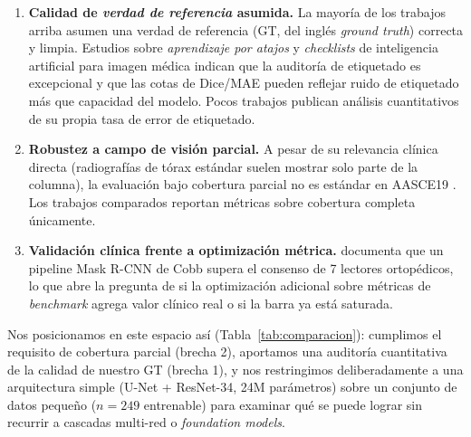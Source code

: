 \documentclass[conference]{IEEEtran}
\begin{document}
\begin{enumerate}
\item \textbf{Calidad de \emph{verdad de referencia} asumida.} La mayoría de los trabajos arriba asumen una verdad de referencia (GT, del inglés \emph{ground truth}) correcta y limpia. Estudios sobre \emph{aprendizaje por atajos} \cite{shortcut} y \emph{checklists} de inteligencia artificial para imagen médica \cite{claim} indican que la auditoría de etiquetado es excepcional y que las cotas de Dice/MAE pueden reflejar ruido de etiquetado más que capacidad del modelo. Pocos trabajos publican análisis cuantitativos de su propia tasa de error de etiquetado.
\item \textbf{Robustez a campo de visión parcial.} A pesar de su relevancia clínica directa (radiografías de tórax estándar suelen mostrar solo parte de la columna), la evaluación bajo cobertura parcial no es estándar en AASCE19 \cite{aasce19}. Los trabajos comparados \cite{seg4reg, lanet, scolionet} reportan métricas sobre cobertura completa únicamente.
\item \textbf{Validación clínica frente a optimización métrica.} \cite{mazurowski} documenta que un pipeline Mask R-CNN de Cobb supera el consenso de 7 lectores ortopédicos, lo que abre la pregunta de si la optimización adicional sobre métricas de \emph{benchmark} agrega valor clínico real o si la barra ya está saturada.
\end{enumerate}

Nos posicionamos en este espacio así (Tabla~\ref{tab:comparacion}): cumplimos el requisito de cobertura parcial (brecha 2), aportamos una auditoría cuantitativa de la calidad de nuestro GT (brecha 1), y nos restringimos deliberadamente a una arquitectura simple (U-Net + ResNet-34, 24M parámetros) sobre un conjunto de datos pequeño ($n=249$ entrenable) para examinar qué se puede lograr sin recurrir a cascadas multi-red o \emph{foundation models}.
\end{document}
